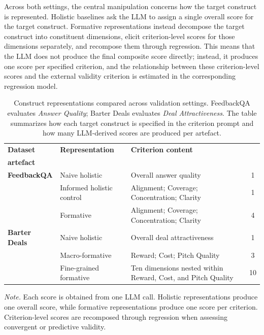 Across both settings, the central manipulation concerns how the target construct is represented. Holistic baselines ask the LLM to assign a single overall score for the target construct. Formative representations instead decompose the target construct into constituent dimensions, elicit criterion-level scores for those dimensions separately, and recompose them through regression. This means that the LLM does not produce the final composite score directly; instead, it produces one score per specified criterion, and the relationship between these criterion-level scores and the external validity criterion is estimated in the corresponding regression model.


\begin{table}[!h]
\centering
\small
\caption{Construct representations compared across validation settings. FeedbackQA evaluates \textit{Answer Quality}; Barter Deals evaluates \textit{Deal Attractiveness}. The table summarizes how each target construct is specified in the criterion prompt and how many LLM-derived scores are produced per artefact.}
\label{tab:construct_representations}
\begin{tabularx}{\textwidth}{@{} 
    l 
    >{\raggedright\arraybackslash}p{3.8cm} 
    >{\raggedright\arraybackslash}X 
    c 
    @{}}
\toprule
\textbf{Dataset} & \textbf{Representation} & \textbf{Criterion content} & \begin{tabular}{@{}c@{}}\textbf{Scores /} \\ \textbf{artefact}\end{tabular} \\
\midrule
\textbf{FeedbackQA} 
& Naive holistic 
& Overall answer quality 
& 1 \\
\addlinespace
& Informed holistic control 
& Alignment; Coverage; Concentration; Clarity 
& 1 \\
\addlinespace
& Formative 
& Alignment; Coverage; Concentration; Clarity 
& 4 \\

\midrule

\textbf{Barter Deals} 
& Naive holistic 
& Overall deal attractiveness 
& 1 \\
\addlinespace
& Macro-formative 
& Reward; Cost; Pitch Quality 
& 3 \\
\addlinespace
& Fine-grained formative 
& Ten dimensions nested within Reward, Cost, and Pitch Quality 
& 10 \\
\bottomrule
\end{tabularx}

\vspace{0.15cm}
\begin{flushleft}
\footnotesize
\textit{Note.} Each score is obtained from one LLM call. Holistic representations produce one overall score, while formative representations produce one score per criterion. Criterion-level scores are recomposed through regression when assessing convergent or predictive validity.
\end{flushleft}
\end{table}

